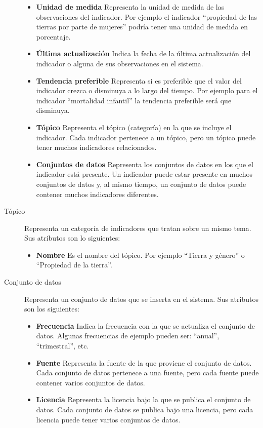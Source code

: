 \begin{description}
\begin{itemize}
							\item \textbf{Unidad de medida}  Representa la unidad de medida de las observaciones del indicador.  Por ejemplo el indicador ``propiedad de las tierras por parte de mujeres'' podría tener una unidad de medida en porcentaje.
							\item \textbf{Última actualización}  Indica la fecha de la última actualización del indicador o alguna de sus observaciones en el sistema.
							\item \textbf{Tendencia preferible}  Representa si es preferible que el valor del indicador crezca o disminuya a lo largo del tiempo.  Por ejemplo para el indicador ``mortalidad infantil'' la tendencia preferible será que disminuya.
							\item \textbf{Tópico}  Representa el tópico (categoría) en la que se incluye el indicador.  Cada indicador pertenece a un tópico, pero un tópico puede tener muchos indicadores relacionados.
							\item \textbf{Conjuntos de datos}  Representa los conjuntos de datos en los que el indicador está presente.  Un indicador puede estar presente en muchos conjuntos de datos y, al mismo tiempo, un conjunto de datos puede contener muchos indicadores diferentes.
							\end{itemize}
\item[Tópico]  Representa un categoría de indicadores que tratan sobre un mismo tema.  Sus atributos son lo siguientes:
							\begin{itemize}
							\item \textbf{Nombre}  Es el nombre del tópico.  Por ejemplo ``Tierra y género'' o ``Propiedad de la tierra''.
							\end{itemize}
\item[Conjunto de datos]  Representa un conjunto de datos que se inserta en el sistema.  Sus atributos son los siguientes:
							\begin{itemize}
							\item \textbf{Frecuencia}  Indica la frecuencia con la que se actualiza el conjunto de datos.  Algunas frecuencias de ejemplo pueden ser: ``anual'', ``trimestral'', etc.
							\item \textbf{Fuente}  Representa la fuente de la que proviene el conjunto de datos.  Cada conjunto de datos pertenece a una fuente, pero cada fuente puede contener varios conjuntos de datos.
							\item \textbf{Licencia}  Representa la licencia bajo la que se publica el conjunto de datos.  Cada conjunto de datos se publica bajo una licencia, pero cada licencia puede tener varios conjuntos de datos.

\end{itemize}
\end{description}
